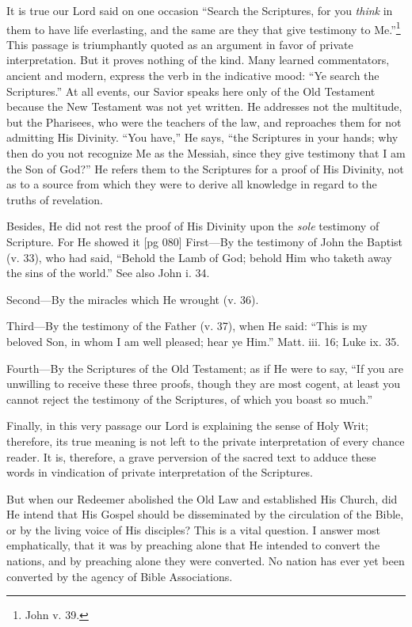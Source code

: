 It is true our Lord said on one occasion
“Search the Scriptures, for you \emph{think} in them to
have life everlasting, and the same are they that
give testimony to Me.”\footnote{John v.
39.} This passage is triumphantly
quoted as an argument in favor of private
interpretation. But it proves nothing of the kind.
Many learned commentators, ancient and modern,
express the verb in the indicative mood: “Ye
search the Scriptures.” At all events, our Savior
speaks here only of the Old Testament because
the New Testament was not yet written.
He addresses not the multitude, but the Pharisees,
who were the teachers of the law, and reproaches
them for not admitting His Divinity. “You
have,” He says, “the Scriptures in your hands;
why then do you not recognize Me as the Messiah,
since they give testimony that I am the Son of
God?” He refers them to the Scriptures for a
proof of His Divinity, not as to a source from
which they were to derive all knowledge in regard
to the truths of revelation.

Besides, He did not rest the proof of His Divinity
upon the \emph{sole} testimony of Scripture. For
He showed it
[pg 080]
First—By the testimony of John the Baptist
(v. 33), who had said, “Behold the Lamb of God;
behold Him who taketh away the sins of the
world.” See also John i. 34.

Second—By the miracles which He wrought
(v. 36).

Third—By the testimony of the Father (v. 37),
when He said: “This is my beloved Son, in whom
I am well pleased; hear ye Him.” Matt. iii. 16;
Luke ix. 35.

Fourth—By the Scriptures of the Old Testament;
as if He were to say, “If you are unwilling
to receive these three proofs, though they are
most cogent, at least you cannot reject the testimony
of the Scriptures, of which you boast so
much.”

Finally, in this very passage our Lord is explaining
the sense of Holy Writ; therefore, its
true meaning is not left to the private interpretation
of every chance reader. It is, therefore, a
grave perversion of the sacred text to adduce
these words in vindication of private interpretation
of the Scriptures.

But when our Redeemer abolished the Old Law
and established His Church, did He intend that
His Gospel should be disseminated by the circulation
of the Bible, or by the living voice of His
disciples? This is a vital question. I answer
most emphatically, that it was by preaching alone
that He intended to convert the nations, and by
preaching alone they were converted. No nation
has ever yet been converted by the agency of
Bible Associations.

